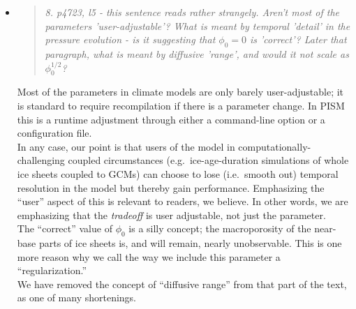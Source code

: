 \documentclass[11pt,reqno]{amsart}
\newcommand{\reply}[2]{
\medskip\medskip
\item  \begin{quote}
\emph{#1}
\end{quote}

\medskip
\noindent #2}
\begin{document}
\begin{itemize}
\reply{8. p4723, l5 - this sentence reads rather strangely.  Aren't most of the parameters 'user-adjustable'?  What is meant by temporal 'detail' in the pressure evolution - is it suggesting that $\phi_0=0$ is 'correct'?  Later that paragraph, what is meant by diffusive 'range', and would it not scale as $\phi_0^{1/2}$?}
{Most of the parameters in climate models are only barely user-adjustable; it is standard to require recompilation if there is a parameter change.  In PISM this is a runtime adjustment through either a command-line option or a configuration file. \\
\indent In any case, our point is that users of the model in computationally-challenging coupled circumstances (e.g.~ice-age-duration simulations of whole ice sheets coupled to GCMs) can choose to lose (i.e.~smooth out) temporal resolution in the model but thereby gain performance.  Emphasizing the ``user'' aspect of this is relevant to readers, we believe.  In other words, we are emphasizing that the \emph{tradeoff} is user adjustable, not just the parameter. \\
\indent The ``correct'' value of $\phi_0$ is a silly concept; the macroporosity of the near-base parts of ice sheets is, and will remain, nearly unobservable.  This is one more reason why we call the way we include this parameter a ``regularization.'' \\
\indent We have removed the concept of ``diffusive range'' from that part of the text, as one of many shortenings.}


\end{itemize}
\end{document}
